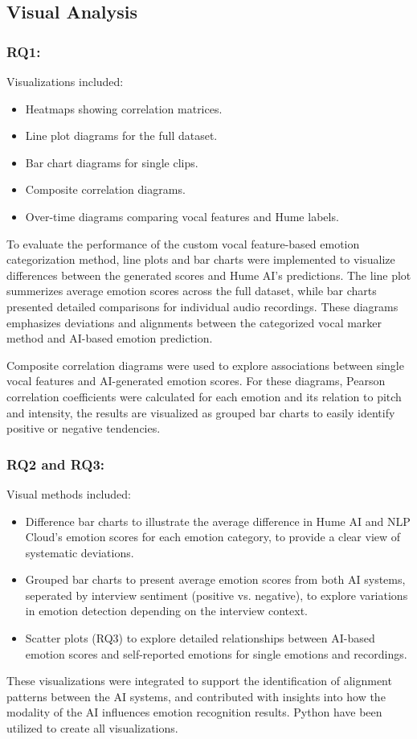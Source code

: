 \subsection{Visual Analysis}
\subsubsection{RQ1:}
Visualizations included: 
\begin{itemize}
    \item Heatmaps showing correlation matrices.
    \item Line plot diagrams for the full dataset. 
    \item Bar chart diagrams for single clips. 
    \item Composite correlation diagrams. 
    \item Over-time diagrams comparing vocal features and Hume labels. 
\end{itemize}
To evaluate the performance of the custom vocal feature-based emotion categorization method, line plots and bar charts were implemented to visualize differences between the generated scores and Hume AI's predictions. 
The line plot summerizes average emotion scores across the full dataset, while bar charts presented detailed comparisons for individual audio recordings. 
These diagrams emphasizes deviations and alignments between the categorized vocal marker method and AI-based emotion prediction. 

Composite correlation diagrams were used to explore associations between single vocal features and AI-generated emotion scores. 
For these diagrams, Pearson correlation coefficients were calculated for each emotion and its relation to pitch and intensity, the results are visualized as grouped bar charts to easily identify positive or negative tendencies. 

\subsubsection{RQ2 and RQ3:}
Visual methods included: 
\begin{itemize}
    \item Difference bar charts to illustrate the average difference in Hume AI and NLP Cloud's emotion scores for each emotion category, to provide a clear view of systematic deviations. 
    \item Grouped bar charts to present average emotion scores from both AI systems, seperated by interview sentiment (positive vs. negative), to explore variations in emotion detection depending on the interview context. 
    \item Scatter plots (RQ3) to explore detailed relationships between AI-based emotion scores and self-reported emotions for single emotions and recordings.
\end{itemize}
These visualizations were integrated to support the identification of alignment patterns between the AI systems, and contributed with insights into how the modality of the AI influences emotion recognition results. 
Python have been utilized to create all visualizations. 

